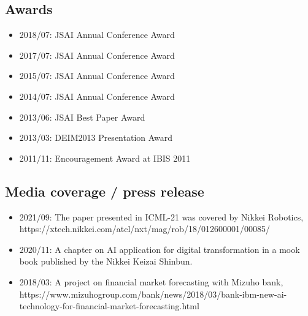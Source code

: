 \documentclass[a4paper,9pt]{article}
\begin{document}
\subsection*{Awards}
\begin{itemize}
 \item 2018/07: JSAI Annual Conference Award
 \item 2017/07: JSAI Annual Conference Award
 \item 2015/07: JSAI Annual Conference Award
 \item 2014/07: JSAI Annual Conference Award
 \item 2013/06: JSAI Best Paper Award
 \item 2013/03: DEIM2013 Presentation Award
 \item 2011/11: Encouragement Award at IBIS 2011
\end{itemize}

\subsection*{Media coverage / press release}
\begin{itemize}
 \item 2021/09: The paper presented in ICML-21 was covered by Nikkei Robotics,  https://xtech.nikkei.com/atcl/nxt/mag/rob/18/012600001/00085/
 \item 2020/11: A chapter on AI application for digital transformation in a mook book published by the Nikkei Keizai Shinbun.
 \item 2018/03: A project on financial market forecasting with Mizuho bank, https://www.mizuhogroup.com/bank/news/2018/03/bank-ibm-new-ai-technology-for-financial-market-forecasting.html
\end{itemize}
\end{document}
